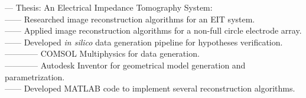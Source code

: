 \begin{itemize}[leftmargin=0in, label={}]
    \small{\item{
        {— Thesis: An Electrical Impedance Tomography System:}\\
        {—— Researched image reconstruction algorithms for an EIT system.}\\
        {—— Applied image reconstruction algorithms for a non-full circle electrode array.}\\
        {—— Developed \textit{in silico} data generation pipeline for hypotheses verification.}\\
        {———— COMSOL Multiphysics for data generation.}\\
        {———— Autodesk Inventor for geometrical model generation and parametrization.}\\
        {—— Developed MATLAB code to implement several reconstruction algorithms.}
    }}
\end{itemize}
